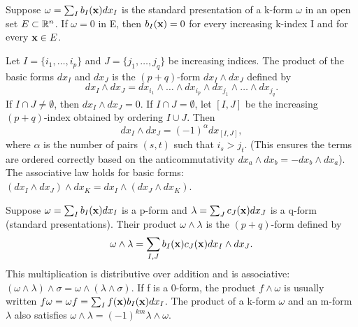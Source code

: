 \begin{theorem}
  \label{thm:chap10:uniqueness_standard_presentation}
  Suppose $\omega = \sum_I b_I(\mathbf{x}) dx_I$ is the standard
  presentation of a k-form $\omega$ in an open set $E \subset \mathbb{R}^n$.
  If $\omega=0$ in E, then $b_I(\mathbf{x})=0$ for every increasing
  k-index I and for every $\mathbf{x} \in E$.
\end{theorem}



\begin{definition}
  \label{def:chap10:product_basic_forms}
  Let $I = \{ i_1, \dots, i_p \}$ and $J = \{ j_1, \dots, j_q \}$ be
  increasing indices. The product of the basic forms $dx_I$ and
  $dx_J$ is the $(p+q)$-form $dx_I \wedge dx_J$ defined by
  \[
    dx_I \wedge dx_J = dx_{i_1} \wedge \dots \wedge dx_{i_p} \wedge
    dx_{j_1} \wedge \dots \wedge dx_{j_q}.
  \]
  If $I \cap J \ne \emptyset$, then $dx_I \wedge dx_J = 0$.
  If $I \cap J = \emptyset$, let $[I, J]$ be the increasing
  $(p+q)$-index obtained by ordering $I \cup J$. Then
  \[
    dx_I \wedge dx_J = (-1)^\alpha dx_{[I, J]},
  \]
  where $\alpha$ is the number of pairs $(s, t)$ such that $i_s >
  j_t$. (This ensures the terms are ordered correctly based on the
  anticommutativity $dx_a \wedge dx_b = - dx_b \wedge dx_a$).
  The associative law holds for basic forms: $(dx_I \wedge dx_J)
  \wedge dx_K = dx_I \wedge (dx_J \wedge dx_K)$.
\end{definition}

\begin{definition}
  \label{def:chap10:product_forms}
  Suppose $\omega = \sum_I b_I(\mathbf{x}) dx_I$ is a p-form and
  $\lambda = \sum_J c_J(\mathbf{x}) dx_J$ is a q-form (standard
  presentations). Their product $\omega \wedge \lambda$ is the
  $(p+q)$-form defined by
  \[
    \omega \wedge \lambda = \sum_{I, J} b_I(\mathbf{x}) c_J(\mathbf{x})
    dx_I \wedge dx_J.
  \]
  This multiplication is distributive over addition and is
  associative: $(\omega \wedge \lambda) \wedge \sigma = \omega \wedge
  (\lambda \wedge \sigma)$.
  If f is a 0-form, the product $f \wedge \omega$ is usually written
  $f \omega = \omega f = \sum_I f(\mathbf{x}) b_I(\mathbf{x}) dx_I$.
  The product of a k-form $\omega$ and an m-form $\lambda$ also
  satisfies $\omega \wedge \lambda = (-1)^{km} \lambda \wedge \omega$.
\end{definition}

